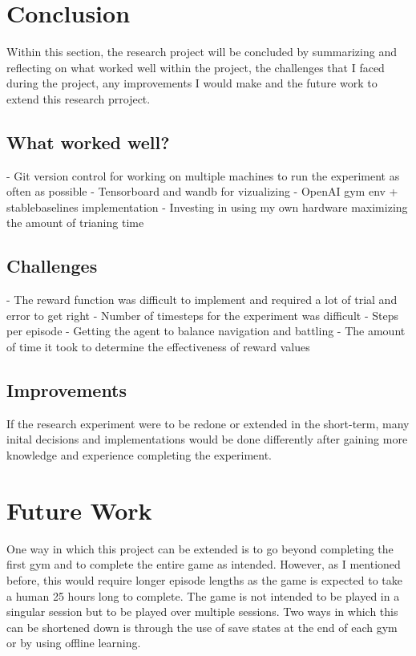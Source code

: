 \section{Conclusion}

Within this section, the research project will be concluded by summarizing and reflecting on what worked well within the project, the challenges that I faced during the project, any improvements I would make and the future work to extend this research prroject.

\subsection{What worked well?}

- Git version control for working on multiple machines to run the experiment as often as possible
- Tensorboard and wandb for vizualizing 
- OpenAI gym env + stablebaselines implementation 
- Investing in using my own hardware maximizing the amount of trianing time 

\subsection{Challenges}

- The reward function was difficult to implement and required a lot of trial and error to get right
- Number of timesteps for the experiment was difficult 
- Steps per episode 
- Getting the agent to balance navigation and battling 
- The amount of time it took to determine the effectiveness of reward values

\subsection{Improvements}

If the research experiment were to be redone or extended in the short-term, many inital decisions and implementations would be done differently after gaining more knowledge and experience completing the experiment. 

\section{Future Work}

One way in which this project can be extended is to go beyond completing the first gym and to complete the entire game as intended. However, as I mentioned before, this would require longer episode lengths as the game is expected to take a human 25 hours long to complete. The game is not intended to be played in a singular session but to be played over multiple sessions. Two ways in which this can be shortened down is through the use of save states at the end of each gym or by using offline learning. 

